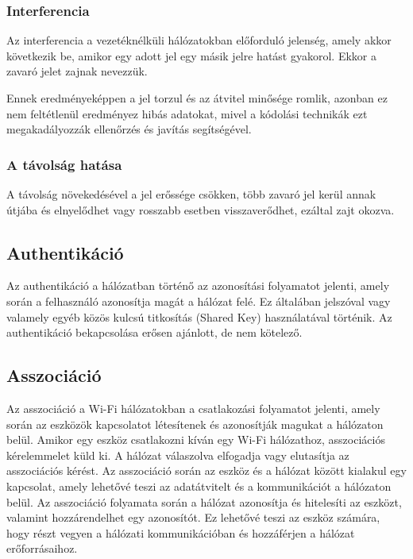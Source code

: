 \documentclass[12pt]{article}
\begin{document}
\subsubsection{Interferencia}

Az interferencia a vezetéknélküli hálózatokban előforduló jelenség, amely akkor következik be, amikor egy adott jel egy másik jelre hatást gyakorol. Ekkor a zavaró jelet zajnak nevezzük.

Ennek eredményeképpen a jel torzul és az átvitel minősége romlik, azonban ez nem feltétlenül eredményez hibás adatokat, mivel a kódolási technikák ezt megakadályozzák ellenőrzés és javítás segítségével.

\subsubsection{A távolság hatása}

A távolság növekedésével a jel erőssége csökken, több zavaró jel kerül annak útjába és elnyelődhet vagy rosszabb esetben visszaverődhet, ezáltal zajt okozva.






\subsection{Authentikáció}

Az authentikáció a hálózatban történő az azonosítási folyamatot jelenti, amely során a felhasználó azonosítja magát a hálózat felé. Ez általában jelszóval vagy valamely egyéb közös kulcsú titkosítás (Shared Key) használatával történik.
Az authentikáció bekapcsolása erősen ajánlott, de nem kötelező.

\subsection{Asszociáció}

Az asszociáció a Wi-Fi hálózatokban a csatlakozási folyamatot jelenti, amely során az eszközök kapcsolatot létesítenek és azonosítják magukat a hálózaton belül. Amikor egy eszköz csatlakozni kíván egy Wi-Fi hálózathoz, asszociációs kérelemmelet küld ki. A hálózat válaszolva elfogadja vagy elutasítja az asszociációs kérést. Az asszociáció során az eszköz és a hálózat között kialakul egy kapcsolat, amely lehetővé teszi az adatátvitelt és a kommunikációt a hálózaton belül. Az asszociáció folyamata során a hálózat azonosítja és hitelesíti az eszközt, valamint hozzárendelhet egy azonosítót.
Ez lehetővé teszi az eszköz számára, hogy részt vegyen a hálózati kommunikációban és hozzáférjen a hálózat erőforrásaihoz.
\end{document}
